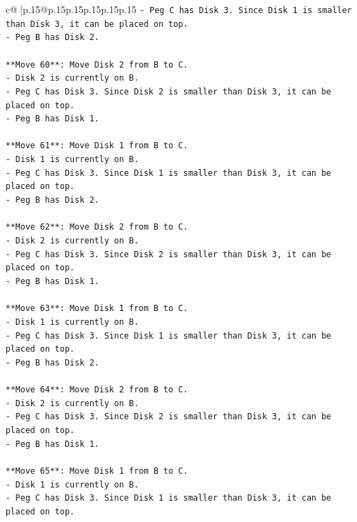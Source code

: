\documentclass{article}
\begin{document}
{\begin{supertabular}{c@{$\;$}|p{.15\linewidth}@{}p{.15\linewidth}p{.15\linewidth}p{.15\linewidth}p{.15\linewidth}p{.15\linewidth}}
{{{\texttt{{-} Peg C has Disk 3. Since Disk 1 is smaller than Disk 3, it can be placed on top.} \\
\texttt{{-} Peg B has Disk 2.} \\
\\ 
\texttt{**Move 60**: Move Disk 2 from B to C.} \\
\texttt{{-} Disk 2 is currently on B.} \\
\texttt{{-} Peg C has Disk 3. Since Disk 2 is smaller than Disk 3, it can be placed on top.} \\
\texttt{{-} Peg B has Disk 1.} \\
\\ 
\texttt{**Move 61**: Move Disk 1 from B to C.} \\
\texttt{{-} Disk 1 is currently on B.} \\
\texttt{{-} Peg C has Disk 3. Since Disk 1 is smaller than Disk 3, it can be placed on top.} \\
\texttt{{-} Peg B has Disk 2.} \\
\\ 
\texttt{**Move 62**: Move Disk 2 from B to C.} \\
\texttt{{-} Disk 2 is currently on B.} \\
\texttt{{-} Peg C has Disk 3. Since Disk 2 is smaller than Disk 3, it can be placed on top.} \\
\texttt{{-} Peg B has Disk 1.} \\
\\ 
\texttt{**Move 63**: Move Disk 1 from B to C.} \\
\texttt{{-} Disk 1 is currently on B.} \\
\texttt{{-} Peg C has Disk 3. Since Disk 1 is smaller than Disk 3, it can be placed on top.} \\
\texttt{{-} Peg B has Disk 2.} \\
\\ 
\texttt{**Move 64**: Move Disk 2 from B to C.} \\
\texttt{{-} Disk 2 is currently on B.} \\
\texttt{{-} Peg C has Disk 3. Since Disk 2 is smaller than Disk 3, it can be placed on top.} \\
\texttt{{-} Peg B has Disk 1.} \\
\\ 
\texttt{**Move 65**: Move Disk 1 from B to C.} \\
\texttt{{-} Disk 1 is currently on B.} \\
\texttt{{-} Peg C has Disk 3. Since Disk 1 is smaller than Disk 3, it can be placed on top.} \\
}}}
\end{supertabular}}
\end{document}
